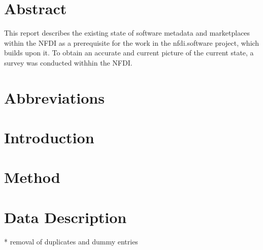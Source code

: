 \documentclass[headsepline,titlepage,twoside,12pt,toc=flat,headings=normal]{scrreprt}
\author{\theauthor}
\date{\thedate}
\title{\thetitle}
\subtitle{Deliverable 2.2}
\begin{document}
\maketitle
\imprint

\chapter*{Abstract}\label{ch:abstract}

This report describes the existing state of software metadata and marketplaces within the NFDI as a prerequisite for the work in the nfdi.software project, which builds upon it.
To obtain an accurate and current picture of the current state, a survey was conducted withhin the NFDI.

\chapter*{Abbreviations}%

\begin{acronym}
\end{acronym}

\tableofcontents
{}

\chapter{Introduction}\label{ch:introduction}

\chapter{Method}\label{ch:introduction}

\chapter{Data Description}\label{ch:introduction}
* removal of duplicates and dummy entries
\end{document}
